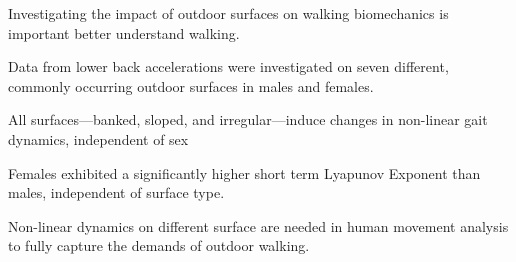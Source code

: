 \documentclass[preprint,12pt]{elsarticle}
\begin{document}
\begin{frontmatter}

\begin{highlights}
    \item Investigating the impact of outdoor surfaces on walking biomechanics is important better understand walking.  
    \item Data from lower back accelerations were investigated on seven different, commonly occurring outdoor surfaces in males and females.
    \item All surfaces---banked, sloped, and irregular---induce changes in non-linear gait dynamics, independent of sex
    \item Females exhibited a significantly higher short term Lyapunov Exponent than males, independent of surface type.
    \item Non-linear dynamics on different surface are needed in human movement analysis to fully capture the demands of outdoor walking.
\end{highlights}

\end{frontmatter}
\end{document}
